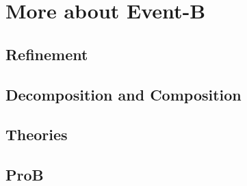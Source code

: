\section{More about Event-B}

\subsection{Refinement}

\subsection{Decomposition and Composition}

\subsection{Theories}

\subsection{ProB}

